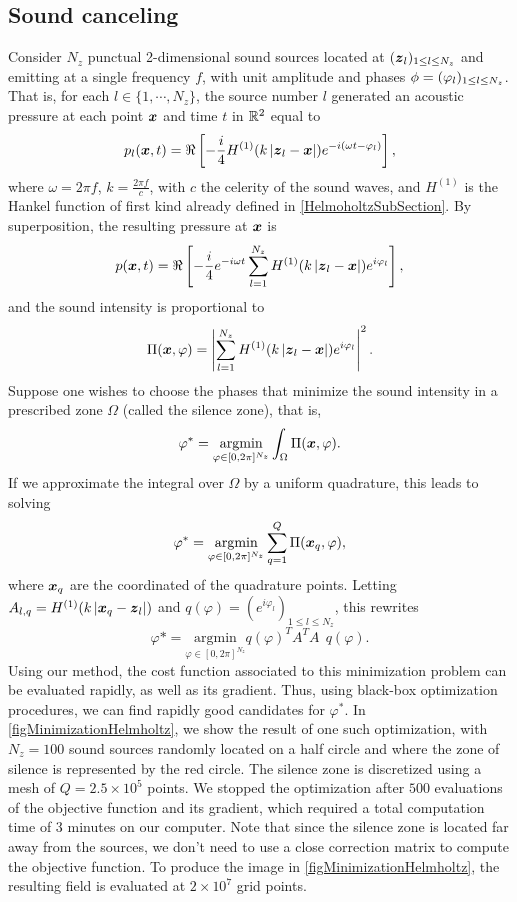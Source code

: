 \documentclass[smallextended]{svjour3}
\begin{document}
\subsection{Sound canceling}
																																																		
Consider $N_z$ punctual 2-dimensional sound sources located at $(\boldsymbol{z}_{l})_{1 \leq l \leq N_z}$  and emitting at a single frequency $f$, with unit amplitude and phases $\phi = (\varphi_{l})_{1 \leq l \leq N_z}$. That is, for each $l \in \{1,\cdots, N_z\}$, the source number $l$ generated an acoustic pressure at each point $\boldsymbol{x}$ and time $t$ in $\mathbb{R}^2$ equal to 
\[p_l(\boldsymbol{x},t) = \Re\left[-\frac{i}{4}H^{(1)}(k\left\lvert \boldsymbol{z}_l - \boldsymbol{x} \right\rvert) e^{-i\left(\omega t - \varphi_l \right)}\right],\]
where $\omega = 2\pi f$, $k = \frac{2\pi f}{c}$, with $c$ the celerity of the sound waves, and $H^{(1)}$ is the Hankel function of first kind already defined in \autoref{HelmoholtzSubSection}. 
By superposition, the resulting pressure at $\boldsymbol{x}$ is 
\[p(\boldsymbol{x},t) = \Re\left[ -\frac{i}{4}e^{-i \omega t} \sum_{l=1}^{N_z} H^{(1)}(k\left\lvert \boldsymbol{z}_l - \boldsymbol{x} \right\rvert)e^{i \varphi_l} \right],\]
and the sound intensity is proportional to
\[\Pi(\boldsymbol{x},\varphi) =  \left\lvert  \sum_{l=1}^{N_z} H^{(1)}(k\left\lvert \boldsymbol{z}_l - \boldsymbol{x} \right\rvert)e^{i \varphi_l}  \right\rvert^2.\]
Suppose one wishes to choose the phases that minimize the sound intensity in a prescribed zone $\Omega$ (called the silence zone), that is,
\[ \varphi^* = \underset{\varphi \in [0,2\pi]^{N_z}}{\text{argmin}}\int_{\Omega}\Pi(\boldsymbol{x},\varphi). \]
If we approximate the integral over $\Omega$ by a uniform quadrature, this leads to solving 
\[\varphi^* = \underset{\varphi \in [0,2\pi]^{N_z}}{\text{argmin}} \sum_{q=1}^{Q}\Pi(\boldsymbol{x}_q,\varphi), \]
where $\boldsymbol{x}_q$ are the coordinated of the quadrature points. Letting $A_{l,q} = H^{(1)}(k\left\lvert \boldsymbol{x}_q - \boldsymbol{z}_l \right\rvert)$ and $q(\varphi) = \left(e^{i\varphi_l}\right)_{1 \leq l \leq N_z}$, this rewrites
\[ \varphi* = \underset{\varphi \in [0,2\pi]^{N_z}}{\text{argmin}} q(\varphi)^T A^T A ~ ~ q(\varphi).\]
Using our method, the cost function associated to this minimization problem can be evaluated rapidly, as well as its gradient. Thus, using black-box optimization procedures, we can find rapidly good candidates for $\varphi^*$. In \autoref{figMinimizationHelmholtz}, we show the result of one such optimization, with $N_z=100$ sound sources randomly located on a half circle and where the zone of silence is represented by the red circle. The silence zone is discretized using a mesh of $Q = 2.5\times 10^5$ points. We stopped the optimization after $500$ evaluations of the objective function and its gradient, which required a total computation time of 3 minutes on our computer. Note that since the silence zone is located far away from the sources, we don't need to use a close correction matrix to compute the objective function. To produce the image in \autoref{figMinimizationHelmholtz}, the resulting field is evaluated at $2 \times 10^7$ grid points.
																																																		
\end{document}
